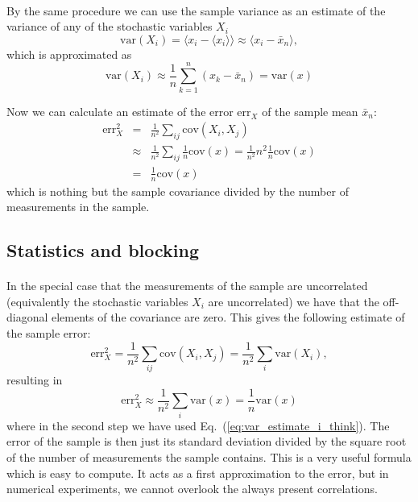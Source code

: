 \documentclass[%
twoside,                 %
final,                   %
10pt]{article}
\begin{document}
\paragraph{}
By the same procedure we can use the sample variance as an
estimate of the variance of any of the stochastic variables $X_i$
\[
\mathrm{var}(X_i)=\langle x_i - \langle x_i\rangle\rangle \approx \langle x_i - \bar x_n\rangle\nonumber,
\]
which is approximated as 
\begin{equation}
\mathrm{var}(X_i)\approx \frac{1}{n}\sum_{k=1}^n (x_k - \bar x_n)=\mathrm{var}(x)
\label{eq:var_estimate_i_think}
\end{equation}

Now we can calculate an estimate of the error
$\mathrm{err}_X^{\phantom X}$ of the sample mean $\bar x_n$:
\begin{eqnarray}
\mathrm{err}_X^2
&=&\frac{1}{n^2}\sum_{ij} \mathrm{cov}(X_i, X_j) \nonumber \\
&\approx&\frac{1}{n^2}\sum_{ij}\frac{1}{n}\mathrm{cov}(x) =\frac{1}{n^2}n^2\frac{1}{n}\mathrm{cov}(x)\nonumber\\
&=&\frac{1}{n}\mathrm{cov}(x)
\label{eq:error_estimate}
\end{eqnarray}
which is nothing but the sample covariance divided by the number of
measurements in the sample.



\subsection{Statistics and blocking}

\paragraph{}

In the special case that the measurements of the sample are
uncorrelated (equivalently the stochastic variables $X_i$ are
uncorrelated) we have that the off-diagonal elements of the covariance
are zero. This gives the following estimate of the sample error:
\[
\mathrm{err}_X^2=\frac{1}{n^2}\sum_{ij} \mathrm{cov}(X_i, X_j) =
\frac{1}{n^2} \sum_i \mathrm{var}(X_i),
\]
resulting in
\begin{equation}
\mathrm{err}_X^2\approx \frac{1}{n^2} \sum_i \mathrm{var}(x)= \frac{1}{n}\mathrm{var}(x)
\label{eq:error_estimate_uncorrel}
\end{equation}
where in the second step we have used Eq.~(\ref{eq:var_estimate_i_think}).
The error of the sample is then just its standard deviation divided by
the square root of the number of measurements the sample contains.
This is a very useful formula which is easy to compute. It acts as a
first approximation to the error, but in numerical experiments, we
cannot overlook the always present correlations.
\end{document}
